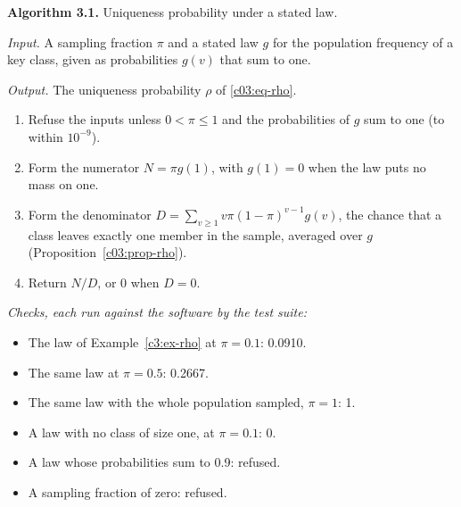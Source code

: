 \begin{mdframed}[linecolor=gray!60,backgroundcolor=gray!5]
\textbf{Algorithm 3.1.} Uniqueness probability under a stated law.\par\smallskip
\textit{Input.} A sampling fraction $\pi$ and a stated law $g$ for the population frequency of a key class, given as probabilities $g(v)$ that sum to one.\par
\textit{Output.} The uniqueness probability $\rho$ of \eqref{c03:eq-rho}.
\begin{enumerate}
\item Refuse the inputs unless $0<\pi\le1$ and the probabilities of $g$ sum to one (to within $10^{-9}$).
\item Form the numerator $N=\pi g(1)$, with $g(1)=0$ when the law puts no mass on one.
\item Form the denominator $D=\sum_{v\ge1}v\pi(1-\pi)^{v-1}g(v)$, the chance that a class leaves exactly one member in the sample, averaged over $g$ (Proposition~\ref{c03:prop-rho}).
\item Return $N/D$, or 0 when $D=0$.
\end{enumerate}
\textit{Checks, each run against the software by the test suite:}
\begin{itemize}
\item The law of Example~\ref{c3:ex-rho} at $\pi=0.1$: 0.0910.
\item The same law at $\pi=0.5$: 0.2667.
\item The same law with the whole population sampled, $\pi=1$: 1.
\item A law with no class of size one, at $\pi=0.1$: 0.
\item A law whose probabilities sum to 0.9: refused.
\item A sampling fraction of zero: refused.
\end{itemize}


\end{mdframed}
